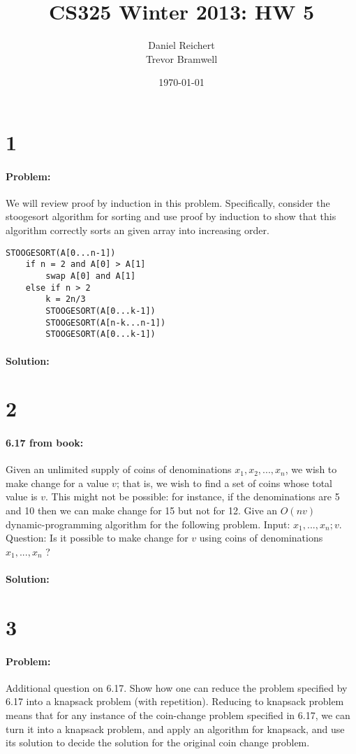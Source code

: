 \documentclass[12pt]{article}
\title{CS325 Winter 2013: HW 5}
\author{
    Daniel Reichert \\
    Trevor Bramwell \\
}
\date{\today}
\newcommand{\BigO}[1]{\ensuremath{O(#1)}}
\begin{document}
\maketitle
\section*{1}
\paragraph{Problem:}
We will review proof by induction in this problem. Specifically, consider the
stoogesort algorithm for sorting and use proof by induction to show that this
algorithm correctly sorts an given array into increasing order.
\begin{lstlisting}[mathescape]
STOOGESORT(A[0...n-1])
    if n = 2 and A[0] > A[1]
        swap A[0] and A[1]
    else if n > 2
        k = 2n/3
        STOOGESORT(A[0...k-1])
        STOOGESORT(A[n-k...n-1])
        STOOGESORT(A[0...k-1])
\end{lstlisting}
\paragraph{Solution:}

\section*{2}
\paragraph{6.17 from book:}
Given an unlimited supply of coins of denominations $x_1 , x_2 , . . . , x_n$,
we wish to make change for a value $v$; that is, we wish to find a set of coins
whose total value is $v$. This might not be possible: for instance, if the
denominations are 5 and 10 then we can make change for 15 but not for 12.
Give an $\BigO{nv}$ dynamic-programming algorithm for the following problem.
Input: $x_1 , . . . , x_n ; v$.
Question: Is it possible to make change for $v$ using coins of denominations
 $x_1 , . . . , x_n$ ?
\paragraph{Solution:}


\section*{3}
\paragraph{Problem:}
Additional question on 6.17. Show how one can reduce the problem specified by
6.17 into a knapsack problem (with repetition). Reducing to knapsack problem
means that for any instance of the coin-change problem specified in 6.17, we
can turn it into a knapsack problem, and apply an algorithm for knapsack, and
use its solution to decide the solution for the original coin change problem.
\end{document}
